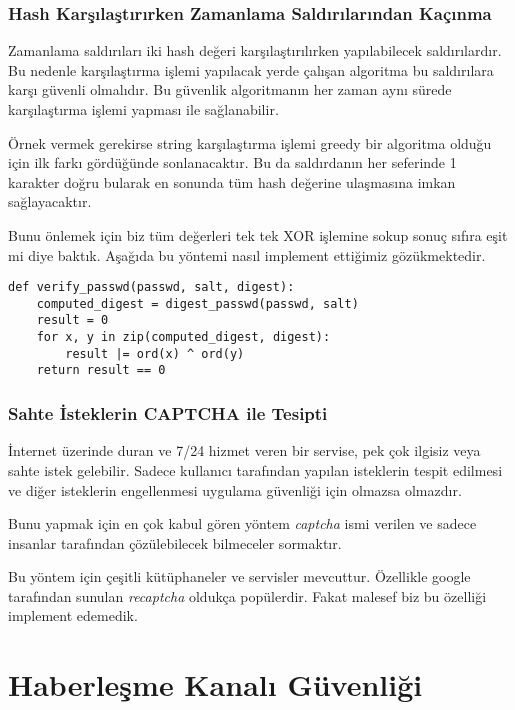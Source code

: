 \documentclass[11pt,a4paper]{report}
\begin{document}
\subsection{Hash Karşılaştırırken Zamanlama Saldırılarından Kaçınma}
Zamanlama saldırıları iki hash değeri karşılaştırılırken yapılabilecek saldırılardır. Bu nedenle karşılaştırma işlemi yapılacak yerde çalışan algoritma bu saldırılara karşı güvenli olmalıdır. Bu güvenlik algoritmanın her zaman aynı sürede karşılaştırma işlemi yapması ile sağlanabilir.

Örnek vermek gerekirse string karşılaştırma işlemi greedy bir algoritma olduğu için ilk farkı gördüğünde sonlanacaktır. Bu da saldırdanın her seferinde 1 karakter doğru bularak en sonunda tüm hash değerine ulaşmasına imkan sağlayacaktır.

Bunu önlemek için biz tüm değerleri tek tek XOR işlemine sokup sonuç sıfıra eşit mi diye baktık. Aşağıda bu yöntemi nasıl implement ettiğimiz gözükmektedir.

\begin{lstlisting}[caption=Zamanlama Saldırılarına Karşı Sabit Zamanlı Karşılaştırma]
def verify_passwd(passwd, salt, digest):
    computed_digest = digest_passwd(passwd, salt)
    result = 0
    for x, y in zip(computed_digest, digest):
        result |= ord(x) ^ ord(y)
    return result == 0

\end{lstlisting}

\subsection{Sahte İsteklerin CAPTCHA ile Tesipti}
İnternet üzerinde duran ve 7/24 hizmet veren bir servise, pek çok ilgisiz veya sahte istek gelebilir. Sadece kullanıcı tarafından yapılan isteklerin tespit edilmesi ve diğer isteklerin engellenmesi uygulama güvenliği için olmazsa olmazdır.

Bunu yapmak için en çok kabul gören yöntem \emph{captcha} ismi verilen ve sadece insanlar tarafından çözülebilecek bilmeceler sormaktır.

Bu yöntem için çeşitli kütüphaneler ve servisler mevcuttur. Özellikle google tarafından sunulan \emph{recaptcha} oldukça popülerdir. Fakat malesef biz bu özelliği implement edemedik.

\chapter{Haberleşme Kanalı Güvenliği}
\end{document}
